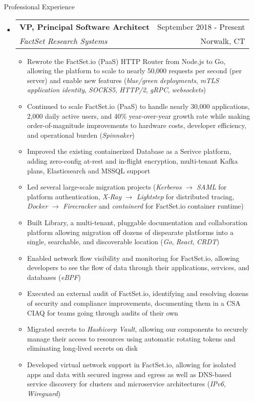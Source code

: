 \documentclass[letterpaper,10pt]{article}
\makeatletter
\newenvironment{ressection}[1]{
	\vspace{4pt}
	{\fontfamily{phv}\selectfont\Large#1}
	\begin{itemize}
	\vspace{3pt}
}{
	\end{itemize}
}
\newcommand{\ressubitem}[1]{
	\vspace{-1pt}
	\item \begin{flushleft} #1 \end{flushleft}
}
\newcommand{\resbigitem}[4]{
	\vspace{-5pt}
	\item
	\begin{tabular*}{6in}{l@{\extracolsep{\fill}}r}
		\textbf{#1} & #2 \\
		\textit{#3} & #4\\
	\end{tabular*}
}
\newenvironment{ressubsec}[4]{
	\resbigitem{#1}{#2}{#3}{#4}
	\vspace{-2pt}
	\begin{itemize}
}{
	\end{itemize}
}
\makeatother
\begin{document}
\begin{ressection}{Professional Experience}
\begin{ressubsec}{VP, Principal Software Architect}{September 2018 - Present}{FactSet Research Systems}{Norwalk, CT}
		\ressubitem{Rewrote the FactSet.io (PaaS) HTTP Router from Node.js to Go, allowing the platform to scale to nearly 50,000 requests per second (per server) and enable new features (\textit{blue/green deployments}, \textit{mTLS application identity}, \textit{SOCKS5}, \textit{HTTP/2}, \textit{gRPC}, \textit{websockets})}
		\ressubitem{Continued to scale FactSet.io (PaaS) to handle nearly 30,000 applications, 2,000 daily active users, and 40\% year-over-year growth rate while making order-of-magnitude improvements to hardware costs, developer efficiency, and operational burden (\textit{Spinnaker})}
		\ressubitem{Improved the existing containerized Database as a Serivce platform, adding zero-config at-rest and in-flight encryption, multi-tenant Kafka plans, Elasticsearch and MSSQL support}
		\ressubitem{Led several large-scale migration projects (\textit{Kerberos} $\rightarrow$ \textit{SAML} for platform authentication, \textit{X-Ray} $\rightarrow$ \textit{Lightstep} for distributed tracing, \textit{Docker} $\rightarrow$ \textit{Firecracker} and \textit{containerd} for FactSet.io container runtime)}
		\ressubitem{Built Library, a multi-tenant, pluggable documentation and collaboration platform allowing migration off dozens of dispearate platforms into a single, searchable, and discoverable location (\textit{Go}, \textit{React}, \textit{CRDT})}
		\ressubitem{Enabled network flow visibility and monitoring for FactSet.io, allowing developers to see the flow of data through their applications, services, and databases (\textit{eBPF})}
		\ressubitem{Executed an external audit of FactSet.io, identifying and resolving dozens of security and compliance improvements, documenting them in a CSA CIAQ for teams going through audits of their own}
		\ressubitem{Migrated secrets to \textit{Hashicorp Vault}, allowing our components to securely manage their access to resources using automatic rotating tokens and eliminating long-lived secrets on disk}
		\ressubitem{Developed virtual network support in FactSet.io, allowing for isolated apps and data with secured ingress and egress as well as DNS-based service discovery for clusters and microservice architectures (\textit{IPv6}, \textit{Wireguard})}
	\end{ressubsec}

\pagebreak


\end{ressection}
\end{document}
